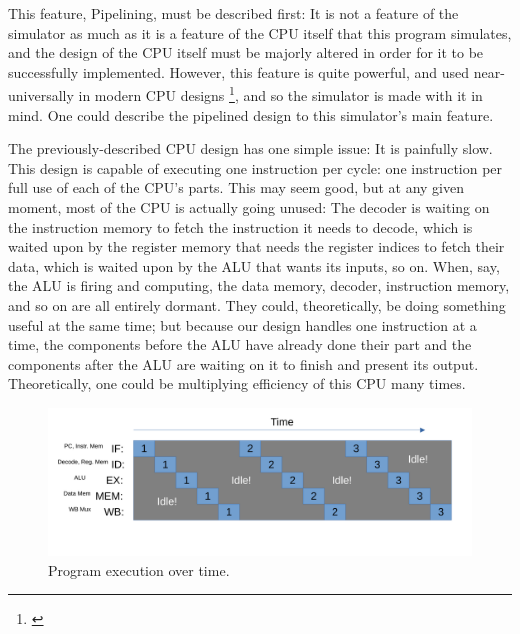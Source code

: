 \documentclass[12pt,twoside]{reedthesis}
\begin{document}
This feature, Pipelining, must be described first: It is not a feature of the simulator as much as it is a feature of the CPU itself that this program simulates, and the design of the CPU itself must be majorly altered in order for it to be successfully implemented. However, this feature is quite powerful, and used near-universally in modern CPU designs \footnote{\cite{denning}}, and so the simulator is made with it in mind. One could describe the pipelined design to this simulator's main feature.

The previously-described CPU design has one simple issue: It is painfully slow. This design is capable of executing one instruction per cycle: one instruction per full use of each of the CPU's parts. This may seem good, but at any given moment, most of the CPU is actually going unused: The decoder is waiting on the instruction memory to fetch the instruction it needs to decode, which is waited upon by the register memory that needs the register indices to fetch their data, which is waited upon by the ALU that wants its inputs, so on.
When, say, the ALU is firing and computing, the data memory, decoder, instruction memory, and so on are all entirely dormant. They could, theoretically, be doing something useful at the same time; but because our design handles one instruction at a time, the components before the ALU have already done their part and the components after the ALU are waiting on it to finish and present its output. Theoretically, one could be multiplying efficiency of this CPU many times.

\begin{figure}[h!]

	\centering
	\includegraphics[scale=0.6]{wastedsteps}
	\caption{Program execution over time.}
	\label{wasted-steps}
\end{figure}
\end{document}
